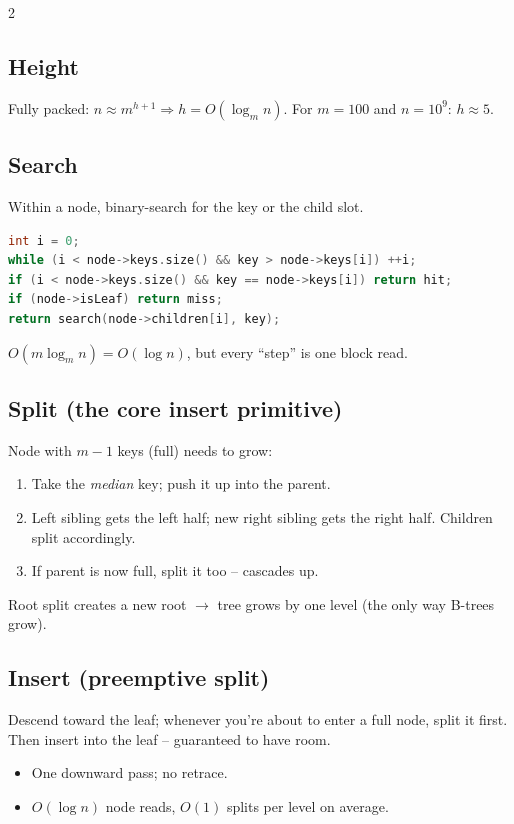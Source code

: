 \documentclass[10pt]{article}
\begin{document}
\begin{multicols}{2}
\subsection*{Height}
Fully packed: $n \approx m^{h+1} \Rightarrow h = O(\log_m n)$.
For $m = 100$ and $n = 10^9$: $h \approx 5$.

\subsection*{Search}
Within a node, binary-search for the key or the child slot.
\begin{lstlisting}[language=C++]
int i = 0;
while (i < node->keys.size() && key > node->keys[i]) ++i;
if (i < node->keys.size() && key == node->keys[i]) return hit;
if (node->isLeaf) return miss;
return search(node->children[i], key);
\end{lstlisting}
$O(m \log_m n) = O(\log n)$, but every ``step'' is one block read.

\subsection*{Split (the core insert primitive)}
Node with $m-1$ keys (full) needs to grow:
\begin{enumerate}
    \item Take the \emph{median} key; push it up into the parent.
    \item Left sibling gets the left half; new right sibling gets the
    right half. Children split accordingly.
    \item If parent is now full, split it too -- cascades up.
\end{enumerate}
Root split creates a new root $\to$ tree grows by one level
(the only way B-trees grow).

\columnbreak

\subsection*{Insert (preemptive split)}
Descend toward the leaf; whenever you're about to enter a full node,
split it first. Then insert into the leaf -- guaranteed to have room.
\begin{itemize}
    \item One downward pass; no retrace.
    \item $O(\log n)$ node reads, $O(1)$ splits per level on average.
\end{itemize}


\end{multicols}
\end{document}
